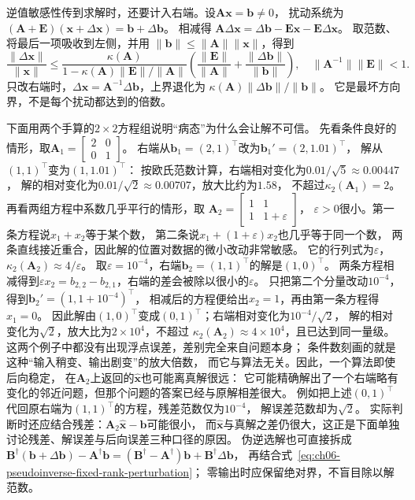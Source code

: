 逆值敏感性传到求解时，还要计入右端。设$\bm A\bm x=\bm b\neq0$，
扰动系统为$(\bm A+\bm E)(\bm x+\Delta\bm x)=\bm b+\Delta\bm b$。
相减得
$\bm A\Delta\bm x=\Delta\bm b-\bm E\bm x-\bm E\Delta\bm x$。
取范数、将最后一项吸收到左侧，并用
$\lVert\bm b\rVert\leq\lVert\bm A\rVert\lVert\bm x\rVert$，得到
\begin{equation}
 \frac{\lVert\Delta\bm x\rVert}{\lVert\bm x\rVert}
 \leq
 \frac{\kappa(\bm A)}
 {1-\kappa(\bm A)\lVert\bm E\rVert/\lVert\bm A\rVert}
 \left(\frac{\lVert\bm E\rVert}{\lVert\bm A\rVert}
       +\frac{\lVert\Delta\bm b\rVert}{\lVert\bm b\rVert}\right),
 \quad \lVert\bm A^{-1}\rVert\lVert\bm E\rVert<1.
 \label{eq:matrix-analysis-linear-system-perturbation}
\end{equation}
只改右端时，$\Delta\bm x=\bm A^{-1}\Delta\bm b$，上界退化为
$\kappa(\bm A)\lVert\Delta\bm b\rVert/\lVert\bm b\rVert$。
它是最坏方向界，不是每个扰动都达到的倍数。

下面用两个手算的$2\times2$方程组说明“病态”为什么会让解不可信。
先看条件良好的情形，取$\bm A_1=\begin{bmatrix}2&0\\0&1\end{bmatrix}$。
右端从$\bm b_1=(2,1)^\top$改为$\bm b_1'=(2,1.01)^\top$，
解从$(1,1)^\top$变为$(1,1.01)^\top$：
按欧氏范数计算，右端相对变化为$0.01/\sqrt5\approx0.00447$，
解的相对变化为$0.01/\sqrt2\approx0.00707$，放大比约为$1.58$，
不超过$\kappa_2(\bm A_1)=2$。
再看两组方程中系数几乎平行的情形，取
$\bm A_2=\begin{bmatrix}1&1\\1&1+\varepsilon\end{bmatrix}$，
$\varepsilon>0$很小。第一条方程说$x_1+x_2$等于某个数，
第二条说$x_1+(1+\varepsilon)x_2$也几乎等于同一个数，
两条直线接近重合，因此解的位置对数据的微小改动非常敏感。
它的行列式为$\varepsilon$，$\kappa_2(\bm A_2)\approx4/\varepsilon$。
取$\varepsilon=10^{-4}$，右端$\bm b_2=(1,1)^\top$的解是$(1,0)^\top$。
两条方程相减得到$\varepsilon x_2=b_{2,2}-b_{2,1}$，右端的差会被除以很小的$\varepsilon$。
只把第二个分量改动$10^{-4}$，得到$\bm b_2'=(1,1+10^{-4})^\top$，
相减后的方程便给出$x_2=1$，再由第一条方程得$x_1=0$。
因此解由$(1,0)^\top$变成$(0,1)^\top$；右端相对变化为$10^{-4}/\sqrt2$，
解的相对变化为$\sqrt2$，放大比为$2\times10^4$，不超过
$\kappa_2(\bm A_2)\approx4\times10^4$，且已达到同一量级。
这两个例子中都没有出现浮点误差，差别完全来自问题本身；
条件数刻画的就是这种“输入稍变、输出剧变”的放大倍数，
而它与算法无关。因此，一个算法即使后向稳定，
在$\bm A_2$上返回的$\widehat{\bm x}$也可能离真解很远：
它可能精确解出了一个右端略有变化的邻近问题，但那个问题的答案已经与原解相差很大。
例如把上述$(0,1)^\top$代回原右端为$(1,1)^\top$的方程，残差范数仅为$10^{-4}$，
解误差范数却为$\sqrt2$。
实际判断时还应结合残差：$\bm A_2\widehat{\bm x}-\bm b$可能很小，
而$\widehat{\bm x}$与真解之差仍很大，这正是下面单独讨论残差、解误差与后向误差三种口径的原因。
伪逆选解也可直接拆成
$\bm B^\dagger(\bm b+\Delta\bm b)-\bm A^\dagger\bm b
=(\bm B^\dagger-\bm A^\dagger)\bm b+\bm B^\dagger\Delta\bm b$，
再结合式~\eqref{eq:ch06-pseudoinverse-fixed-rank-perturbation}；
零输出时应保留绝对界，不盲目除以解范数。

